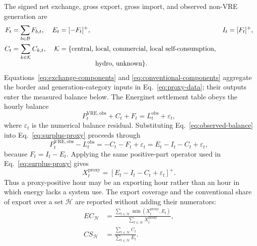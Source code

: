 \documentclass[11pt,a4paper]{article}
\begin{document}
The signed net exchange, gross export, gross import, and observed non-VRE
generation are
\begin{align}
  F_t&=\sum_{b\in\mathcal{B}}F_{b,t},
  &E_t&=[-F_t]^+,
  &I_t&=[F_t]^+,
  \label{eq:exchange-components}\\
  C_t&=\sum_{k\in\mathcal{K}}C_{k,t},
  &\mathcal{K}&=\{\text{central, local, commercial, local self-consumption,}
  \nonumber\\[-0.4em]
  &&&\hspace{5.4em}\text{hydro, unknown}\}.
  \label{eq:conventional-components}
\end{align}
Equations~\eqref{eq:exchange-components} and
\eqref{eq:conventional-components} aggregate the border and generation-category
inputs in Eq.~\eqref{eq:proxy-data}; their outputs enter the measured balance
below.
The Energinet settlement table obeys the hourly balance
\begin{equation}
  P^{\mathrm{VRE,obs}}_t+C_t+F_t
  =L^{\mathrm{obs}}_t+\varepsilon_t,
  \label{eq:observed-balance}
\end{equation}
where $\varepsilon_t$ is the numerical balance residual.  Substituting
Eq.~\eqref{eq:observed-balance} into
Eq.~\eqref{eq:surplus-proxy} proceeds through
\begin{equation}
  P^{\mathrm{VRE,obs}}_t-L^{\mathrm{obs}}_t
  =-C_t-F_t+\varepsilon_t
  =E_t-I_t-C_t+\varepsilon_t,
  \label{eq:proxy-balance-substitution}
\end{equation}
because $F_t=I_t-E_t$.  Applying the same positive-part operator used in
Eq.~\eqref{eq:surplus-proxy} gives
\begin{equation}
  X^{\mathrm{proxy}}_t
  =\left[E_t-I_t-C_t+\varepsilon_t\right]^+.
  \label{eq:proxy-decomposition}
\end{equation}
Thus a proxy-positive hour may be an exporting hour rather than an hour in
which energy lacks a system use.  The export coverage and the conventional
share of export over a set $\mathcal{H}$ are reported without adding their
numerators:
\begin{align}
  EC_{\mathcal{H}}
  &=\frac{\sum_{t\in\mathcal{H}}
  \min(X^{\mathrm{proxy}}_t,E_t)}
  {\sum_{t\in\mathcal{H}}X^{\mathrm{proxy}}_t},
  \label{eq:export-coverage}\\
  CS_{\mathcal{H}}
  &=\frac{\sum_{t\in\mathcal{H}}C_t}
  {\sum_{t\in\mathcal{H}}E_t}.
  \label{eq:conventional-export-share}
\end{align}
\end{document}
